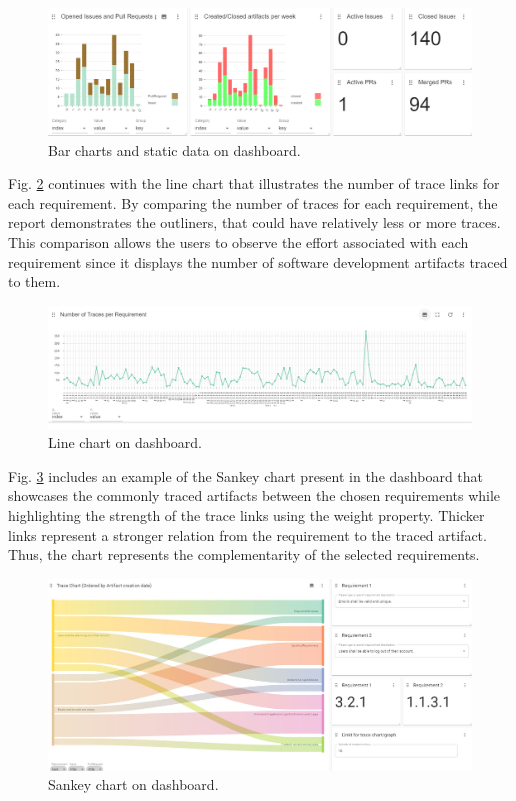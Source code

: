 \begin{figure}[htb]
    \centering
    \includegraphics[width=1\linewidth]{figs/dashboard-barcharts.png}
    \caption{Bar charts and static data on dashboard.}
    \label{fig:barcharts}
\end{figure}

Fig. \ref{fig:linechart} continues with the line chart that illustrates the number of trace links for each requirement. By comparing the number of traces for each requirement, the report demonstrates the outliners, that could have relatively less or more traces. This comparison allows the users to observe the effort associated with each requirement since it displays the number of software development artifacts traced to them.

\begin{figure}[htb]
    \centering
    \includegraphics[width=1\linewidth]{figs/linechart.png}
    \caption{Line chart on dashboard.}
    \label{fig:linechart}
\end{figure}

Fig. \ref{fig:sankey} includes an example of the Sankey chart present in the dashboard that showcases the commonly traced artifacts between the chosen requirements while highlighting the strength of the trace links using the weight property. Thicker links represent a stronger relation from the requirement to the traced artifact. Thus, the chart represents the complementarity of the selected requirements.

\begin{figure}[htb]
    \centering
    \includegraphics[width=1\linewidth]{figs/sankey.jpg}
    \caption{Sankey chart on dashboard.}
    \label{fig:sankey}
\end{figure}

